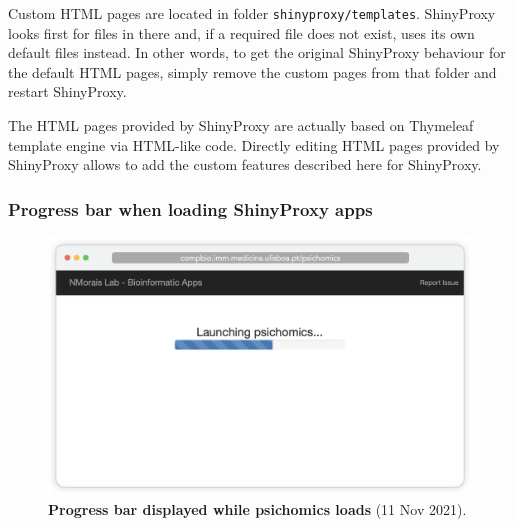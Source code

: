 Custom HTML pages are located in folder \texttt{shinyproxy/templates}. ShinyProxy looks first for files in there and, if a required file does not exist, uses its own default files instead. In other words, to get the original ShinyProxy behaviour for the default HTML pages, simply remove the custom pages from that folder and restart ShinyProxy.

The HTML pages provided by ShinyProxy are actually based on Thymeleaf template engine via HTML-like code. Directly editing HTML pages provided by ShinyProxy allows to add the custom features described here for ShinyProxy.

\subsubsection{Progress bar when loading ShinyProxy apps}

\begin{figure}
  \vspace{-\intextsep}
  \includegraphics[width=\linewidth]{images/app-server/progress-bar}
  \caption[Screenshot of app loading]{\textbf{Progress bar displayed while psichomics loads} (11 Nov 2021).}
  \label{fig:progress-bar}
  \vspace{-\intextsep}
\end{figure}


